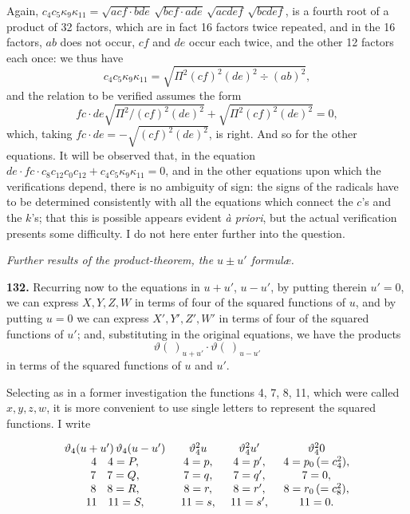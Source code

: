 \documentclass[11pt]{article}
\begin{document}
\medskip
Again, $c_4c_5\kappa_9\kappa_{11} = \sqrt{acf\cdot bde}\,\sqrt{bcf\cdot ade}\,\sqrt{acdef}\,\sqrt{bcdef}$, is a fourth root of a product of 32 factors, which are in fact 16 factors twice repeated, and in the 16 factors, $ab$ does not occur, $cf$ and $de$ occur each twice, and the other 12 factors each once: we thus have
\[
c_4c_5\kappa_9\kappa_{11} = \sqrt{\Pi^2(cf)^2(de)^2 \div (ab)^2},
\]
and the relation to be verified assumes the form
\[
fc\cdot de\sqrt{\Pi^2/(cf)^2(de)^2} + \sqrt{\Pi^2(cf)^2(de)^2} = 0,
\]
which, taking $fc\cdot de = -\sqrt{(cf)^2(de)^2}$, is right. And so for the other equations. It will be observed that, in the equation $de\cdot fc\cdot c_8c_{12}c_0c_{12} + c_4c_5\kappa_9\kappa_{11} = 0$, and in the other equations upon which the verifications depend, there is no ambiguity of sign: the signs of the radicals have to be determined consistently with all the equations which connect the $c$'s and the $k$'s; that this is possible appears evident \textit{\`a priori}, but the actual verification presents some difficulty. I do not here enter further into the question.

\medskip
\begin{center}\textit{Further results of the product-theorem, the $u \pm u'$ formul\ae.}\end{center}

\medskip
\textbf{132.} Recurring now to the equations in $u + u'$, $u - u'$, by putting therein $u' = 0$, we can express $X, Y, Z, W$ in terms of four of the squared functions of $u$, and by putting $u = 0$ we can express $X', Y', Z', W'$ in terms of four of the squared functions of $u'$; and, substituting in the original equations, we have the products
\[
\vartheta(\ )_{u+u'}\cdot \vartheta(\ )_{u-u'}
\]
in terms of the squared functions of $u$ and $u'$.

Selecting as in a former investigation the functions 4, 7, 8, 11, which were called $x, y, z, w$, it is more convenient to use single letters to represent the squared functions. I write

{\small
\[
\begin{array}{c@{\hspace{1.4em}}c@{\hspace{1.4em}}c@{\hspace{1.4em}}c}
\vartheta_4(u+u')\,\vartheta_4(u-u') & \vartheta_4^{2}u & \vartheta_4^{2}u' & \vartheta_4^{2}0\\
4 \quad 4 = P, & 4 = p, & 4 = p', & 4 = p_0\,(= c_4^2),\\
7 \quad 7 = Q, & 7 = q, & 7 = q', & 7 = 0,\\
8 \quad 8 = R, & 8 = r, & 8 = r', & 8 = r_0\,(= c_8^2),\\
11 \quad 11 = S, & 11 = s, & 11 = s', & 11 = 0.\\
\end{array}
\]
}
\end{document}
